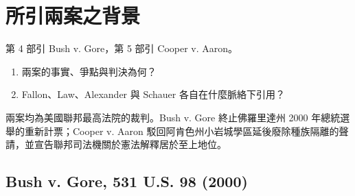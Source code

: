 \chapter{所引兩案之背景}
\label{ch:80_cases}

\begin{qaquestion}
第 4 部引 Bush v. Gore，第 5 部引 Cooper v. Aaron。
\begin{enumerate}
\tightlist
\item 兩案的事實、爭點與判決為何？
\item Fallon、Law、Alexander 與 Schauer 各自在什麼脈絡下引用？
\end{enumerate}
\end{qaquestion}

兩案均為美國聯邦最高法院的裁判。Bush v. Gore 終止佛羅里達州 2000 年總統選舉的重新計票；Cooper v. Aaron 駁回阿肯色州小岩城學區延後廢除種族隔離的聲請，並宣告聯邦司法機關於憲法解釋居於至上地位。

\section{Bush v. Gore, 531 U.S. 98 (2000)}
\label{sec:80_cases-bush}

